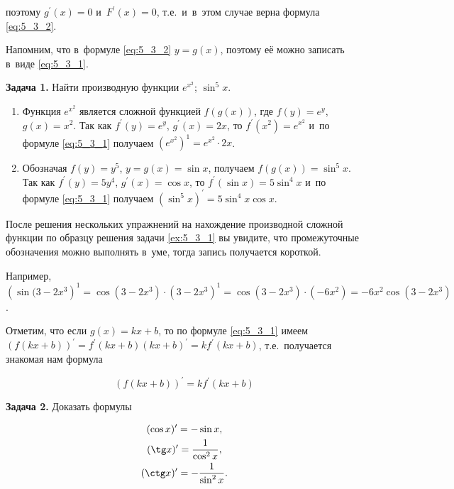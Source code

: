 поэтому $g^\prime(x) = 0$ и~$F^\prime(x) = $0,
т.е.\ и~в~этом случае верна формула \eqref{eq:5_3_2}.

Напомним, что в~формуле \eqref{eq:5_3_2} $y = g(x)$, поэтому её можно записать
в~виде \eqref{eq:5_3_1}.

\textbf{Задача 1.}\label{ex:5_3_1} Найти производную функции $e^{x^{2}}$; $\sin^{5}x$.
\begin{enumerate}
\item Функция $e^{x^{2}}$ является сложной функцией $f(g(x))$,
где $f(y) = e^{y}$, $g(x) = x^{2}$.
Так как $f^\prime (y) = e^{y}$, $g^\prime (x) = 2x$, то $f^\prime (x^{2}) = e^{x^{2}}$
и~по формуле \eqref{eq:5_3_1} получаем $\left( e^{x^{2}} \right)^{1} = e^{x^{2}} \cdot 2x$.

\item Обозначая $f(y) = y^{5}$, $y = g(x) = \sin x$, получаем $f(g(x)) = \sin^{5} x$.
Так как $f^\prime (y) = 5y^{4}$, $g^\prime (x) = \cos x$,
то $f^\prime (\sin x) = 5 \sin^{4} x$ и~по формуле \eqref{eq:5_3_1}
получаем $\left( \sin^{5} x \right)^\prime = 5 \sin^{4} x \cos x$.
\end{enumerate}

После решения нескольких упражнений на нахождение производной сложной функции по образцу
решения задачи \ref{ex:5_3_1} вы увидите, что промежуточные обозначения можно выполнять
в~уме, тогда запись получается короткой.

Например,
$\left( \sin (3 - 2x^{3} \right)^{1} =
\cos \left( 3 - 2x^{3} \right) \cdot \left( 3 - 2x^{3} \right)^{1} = 
\cos (3 - 2x^{3}) \cdot (-6x^{2}) = -6x^{2} \cos (3 - 2x^{3})$.

Отметим, что если $g(x) = kx + b$, то по формуле \eqref{eq:5_3_1} имеем
$\left( f(kx+b) \right)^\prime = f^\prime (kx+b)(kx+b)^\prime = kf^\prime(kx+b)$,
т.е.\ получается знакомая нам формула

\begin{equation}\label{eq:5_3_3}
\left( f(kx+b) \right)^\prime = k f^\prime (kx+b)
\end{equation}

\textbf{Задача 2.}\label{ex:5_3_2} Доказать формулы

\begin{gather}\label{eq:5_3_4}
(\cos x)^\prime = -\sin x,\\
\displaystyle ( \tg x )^\prime = \frac{1}{\cos^{2} x}, \\
( \ctg x )^\prime = -\frac{1}{\sin^{2} x}.
\end{gather}

